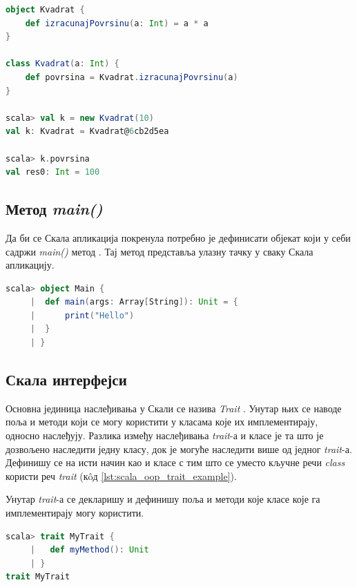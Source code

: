 \documentclass[12pt,oneside]{memoir}
\begin{document}
\begin{lstlisting}[language=Scala, caption={Пример пратиоца}, label={lst:scala_oop_companions_example}]
object Kvadrat {
    def izracunajPovrsinu(a: Int) = a * a
}

class Kvadrat(a: Int) {
    def povrsina = Kvadrat.izracunajPovrsinu(a)
}

scala> val k = new Kvadrat(10)
val k: Kvadrat = Kvadrat@6cb2d5ea

scala> k.povrsina
val res0: Int = 100

\end{lstlisting}

\subsection{Метод \textit{main()}}
\label{subsec:scala_oop_main_app}

Да би се Скала апликација покренула потребно је дефинисати објекат који у себи садржи \textit{main()} метод \cite{scala_prog}. Тај метод представља улазну тачку у сваку Скала апликацију.

\begin{lstlisting}[language=Scala, caption={Пример main метода}, label={lst:scala_oop_main_method}]
scala> object Main {
     |  def main(args: Array[String]): Unit = {
     |      print("Hello")
     | 	}
     | }
\end{lstlisting}

\subsection{Скала интерфејси}
\label{subsec:scala_traits}

Основна јединица наслеђивања у Скали се назива \textit{Trait} \cite{scala_prog}. Унутар њих се наводе поља и методи који се могу користити у класама које их имплементирају, односно наслеђују. Разлика између наслеђивања \textit{trait}-а и класе је та што је дозвољено наследити једну класу, док је могуће наследити више од једног \textit{trait}-а. Дефинишу се на исти начин као и класе с тим што се уместо кључне речи \textit{class} користи реч \textit{trait} (к\^{o}д \ref{lst:scala_oop_trait_example}).

Унутар \textit{trait}-а се декларишу и дефинишу поља и методи које класе које га имплементирају могу користити.

\begin{lstlisting}[language=Scala, caption={Скала \textit{trait}}, label={lst:scala_oop_trait_example}]
scala> trait MyTrait {
     |   def myMethod(): Unit
     | }
trait MyTrait
\end{lstlisting}
\end{document}
